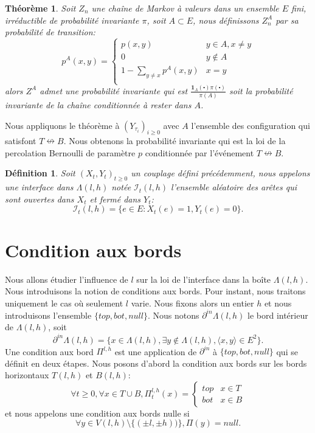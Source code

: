 \documentclass[titlepage,a4paper,12pt]{article}
\newcounter{def}
\newcounter{thm}
\newtheorem{interface}[def]{Définition}
\newtheorem{probainv}[thm]{Théorème}
\begin{document}
\begin{probainv}
Soit $Z_n$ une chaîne de Markov à valeurs dans un ensemble $E$ fini, irréductible de probabilité invariante $\pi$, soit $A\subset E$, nous définissons $Z_n^A$ par sa probabilité de transition:
$$p^A(x,y)=\left\lbrace \begin{array}{cc}
p(x,y) & y\in A, x\neq y \\
0 & y\notin A \\
1-\sum_{y\neq x}p^A(x,y) & x = y\\
\end{array}
\right.
$$
alors $Z^A$ admet une probabilité invariante qui est $\frac{\mathbf{1}_A(\centerdot)\pi(\centerdot)}{\pi(A)}$ soit la probabilité invariante de la chaîne conditionnée à rester dans $A$.
\end{probainv}

Nous appliquons le théorème à $(Y_{\tau_i})_{i\geqslant 0}$ avec $A$ l'ensemble des configuration qui satisfont $T\nleftrightarrow B$. Nous obtenons la probabilité invariante qui est la loi de la percolation Bernoulli de paramètre $p$ conditionnée par l'événement $T\nleftrightarrow B$.

\begin{interface}
Soit $(X_t,Y_t)_{t\geqslant 0}$ un couplage défini précédemment, nous appelons une interface dans $\Lambda({l,h})$ notée $\mathcal{I}_t({l,h})$ l'ensemble aléatoire des arêtes qui sont ouvertes dans $X_t$ et fermé dans $Y_t$: $$ \mathcal{I}_t({l,h}) = \big\{ e\in E: X_t(e) = 1, Y_t(e) = 0 \big\}.
$$
\end{interface}
\section{Condition aux bords}
Nous allons étudier l'influence de $l$ sur la loi de l'interface dans la boîte $\Lambda(l,h)$. Nous introduisons la notion de conditions aux bords. Pour instant, nous traitons uniquement le cas où seulement $l$ varie. Nous fixons alors un entier $h$ et nous introduisons l'ensemble $\{top,bot,null\}$. Nous notons $\partial^{in}\Lambda(l,h)$ le bord intérieur de $\Lambda(l,h)$, soit
$$ \partial^{in}\Lambda(l,h) = \{x\in \Lambda(l,h), \exists y \notin \Lambda(l,h), \langle x,y\rangle\in E^2\}.
$$
Une condition aux bord $\Pi^{l,h}$ est une application de $\partial^{in}$ à $\{top,bot,null\}$ qui se définit en deux étapes.
Nous posons d'abord la condition aux bords sur les bords horizontaux $T(l,h)$ et $B(l,h)$:
$$ \forall t\geqslant 0, \forall x\in T\cup B, \Pi_t^{l,h}(x) = \left\lbrace \begin{array}{ll}
top & x\in T\\
bot & x\in B
\end{array}
\right.
$$ et nous appelons une condition aux bords nulle si
$$\forall y\in V(l,h)\setminus \{(\pm l,\pm h))\}, \Pi(y) = null.
$$
\end{document}
